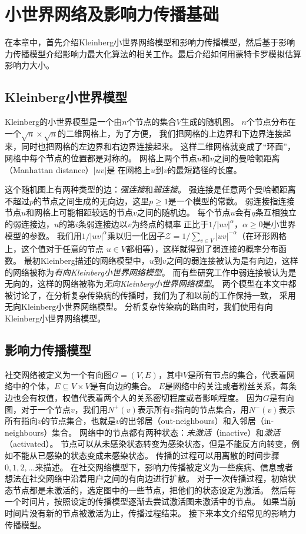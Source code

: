 
\chapter{小世界网络及影响力传播基础}
在本章中，首先介绍Kleinberg小世界网络模型和影响力传播模型，然后基于影响力传播模型介绍影响力最大化算法的相关工作。最后介绍如何用蒙特卡罗模拟估算影响力大小。

\section{Kleinberg小世界模型}\label{sec:kleinberg}
Kleinberg的小世界模型是一个由$n$个节点的集合$V$生成的随机图。
$n$个节点分布在一个$\sqrt{n} \times \sqrt{n}$的二维网格上\cite{Kleinberg2000small}，为了方便，
我们把网格的上边界和下边界连接起来，同时也把网格的左边界和右边界连接起来。
这样二维网格就变成了“环面”，网格中每个节点的位置都是对称的。
网格上两个节点$u$和$v$之间的曼哈顿距离（Manhattan distance）$|uv|$是
在网格上$u$到$v$的最短路径的长度。

这个随机图上有两种类型的边：{\it 强连接}和{\it 弱连接}。
强连接是任意两个曼哈顿距离不超过$p$的节点之间生成的无向边，这里$p \geq 1$是一个模型的常数。
弱连接指连接节点$u$和网格上可能相距较远的节点$v$之间的随机边。
每个节点$u$会有$q$条互相独立的弱连接边，$u$的第$i$条弱连接边以$v$为终点的概率
正比于$1/{|uv|}^\alpha$，$\alpha\geq 0$是小世界模型的参数。
我们用$1/{|uv|}^\alpha$乘以归一化因子$\mathcal{Z} = 1/\sum_{v\in V}|uv|^{-\alpha}$（在环形网格上，这个值对于任意的节点 $u\in V$都相等），这样就得到了弱连接的概率分布函数。
最初Kleinberg描述的网络模型\cite{Kleinberg2000small}中，$u$到$v$之间的弱连接被认为是有向边，这样的网络被称为{\it 有向Kleinberg小世界网络模型}。
而有些研究工作\cite{Ghasemiesfeh2013complex}中弱连接被认为是无向的，这样的网络被称为{\it 无向Kleinberg小世界网络模型}。
两个模型在本文中都被讨论了，在分析复杂传染病的传播时，我们为了和以前的工作保持一致，
采用无向Kleinberg小世界网络模型。
分析复杂传染病的路由时，我们使用有向Kleinberg小世界网络模型。

\section{影响力传播模型}
社交网络被定义为一个有向图$G=(V,E)$，其中$V$是所有节点的集合，代表着网络中的个体，$E\subseteq V \times V$是有向边的集合。
$E$是网络中的关注或者粉丝关系，每条边也会有权值，权值代表着两个人的关系密切程度或者影响程度。
因为$G$是有向图，对于一个节点$v$，我们用$N^+(v)$表示所有$v$指向的节点集合，用$N^-(v)$表示所有指向$v$的节点集合，也就是$v$的出邻居（out-neighbours）和入邻居（in-neighbours）集合。
网络中的节点都有两种状态：{\it 未激活}（inactive）和{\it 激活}（activated）。
节点可以从未感染状态转变为感染状态，但是不能反方向转变，例如不能从已感染的状态变成未感染状态。
传播的过程可以用离散的时间步骤$0,1,2,\ldots$来描述。
在社交网络模型下，影响力传播被定义为一些疾病、信息或者想法在社交网络中沿着用户之间的有向边进行扩散。
对于一次传播过程，初始状态节点都是未激活的，选定图中的一些节点，把他们的状态设定为激活。
然后每一个时间片，按照设定的传播模型逐渐去尝试激活图未激活中的节点。
如果当前时间片没有新的节点被激活为止，传播过程结束。
接下来本文介绍常见的影响力传播模型。



